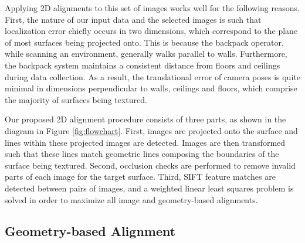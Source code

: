 \documentclass[]{spie}  %
\begin{document}
Applying 2D alignments to this set of images works well for the
following reasons. First, the nature of our input data and the
selected images is such that localization error chiefly occurs in two
dimensions, which correspond to the plane of most surfaces being
projected onto. This is because the backpack operator, while scanning
an environment, generally walks parallel to walls. Furthermore, the
backpack system maintains a consistent distance from floors and
ceilings during data collection. As a result, the translational error
of camera poses is quite minimal in dimensions perpendicular to walls,
ceilings and floors, which comprise the majority of surfaces being
textured.

Our proposed 2D alignment procedure consists of three parts, as shown
in the diagram in Figure \ref{fig:flowchart}. First, images are
projected onto the surface and lines within these projected images are
detected. Images are then transformed such that these lines match
geometric lines composing the boundaries of the surface being
textured. Second, occlusion checks are performed to remove invalid
parts of each image for the target surface. Third, SIFT feature
matches are detected between pairs of images, and a weighted linear
least squares problem is solved in order to maximize all image and
geometry-based alignments.


\subsection{Geometry-based Alignment}
\label{sec:geometryAlignment}
\end{document}
